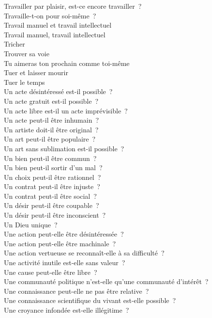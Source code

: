 \documentclass[a4paper,12pt]{article}
\begin{document}
Travailler par plaisir, est-ce encore travailler ? \\
Travaille-t-on pour soi-même ? \\
Travail manuel et travail intellectuel \\
Travail manuel, travail intellectuel \\
Tricher \\
Trouver sa voie \\
Tu aimeras ton prochain comme toi-même \\
Tuer et laisser mourir \\
Tuer le temps \\
Un acte désintéressé est-il possible ? \\
Un acte gratuit est-il possible ? \\
Un acte libre est-il un acte imprévisible ? \\
Un acte peut-il être inhumain ? \\
Un artiste doit-il être original ? \\
Un art peut-il être populaire ? \\
Un art sans sublimation est-il possible ? \\
Un bien peut-il être commun ? \\
Un bien peut-il sortir d'un mal ? \\
Un choix peut-il être rationnel ? \\
Un contrat peut-il être injuste ? \\
Un contrat peut-il être social ? \\
Un désir peut-il être coupable ? \\
Un désir peut-il être inconscient ? \\
Un Dieu unique ? \\
Une action peut-elle être désintéressée ? \\
Une action peut-elle être machinale ? \\
Une action vertueuse se reconnaît-elle à sa difficulté ? \\
Une activité inutile est-elle sans valeur ? \\
Une cause peut-elle être libre ? \\
Une communauté politique n'est-elle qu'une communauté d'intérêt ? \\
Une connaissance peut-elle ne pas être relative ? \\
Une connaissance scientifique du vivant est-elle possible ? \\
Une croyance infondée est-elle illégitime ? \\
\end{document}
